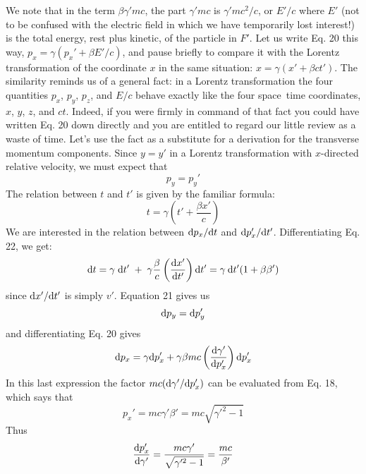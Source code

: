 We note that in the term $\beta\gamma'mc$, the part $\gamma'mc$ is $\gamma'mc^2/c$, or $E'/c$
where $E'$ (not to be confused with the electric field in which we have
temporarily lost interest!) is the total energy, rest plus kinetic, of the
particle in $F'$. Let us write Eq. 20 this way, $p_x = \gamma(p_x' + \beta E'/c)$, and
pause briefly to compare it with the Lorentz transformation of the
coordinate $x$ in the same situation: $x = \gamma(x' + \beta ct')$. The similarity
reminds us of a general fact: in a Lorentz transformation the four
quantities $p_x$, $p_y$, $p_z$, and $E/c$ behave exactly like the four space~time
coordinates, $x$, $y$, $z$, and $ct$. Indeed, if you were firmly in command
of that fact you could have written Eq. 20 down directly and you are
entitled to regard our little review as a waste of time. Let's use the
fact as a substitute for a derivation for the transverse momentum
components. Since $y = y'$ in a Lorentz transformation with
$x$-directed relative velocity, we must expect that
\begin{equation}
  p_y = p_y'
\end{equation}
The relation between $t$ and $t'$ is given by the familiar formula:
\begin{equation}
  t = \gamma\left(t'+\frac{\beta x'}{c}\right)
\end{equation}
We are interested in the relation between $\textup{d} p_x/\textup{d} t$ and $\textup{d} p_x'/\textup{d} t'$.
Differentiating Eq. 22, we get:
\begin{equation}
  \textup{d} t = \gamma\; \textup{d} t'\;+\;\gamma\frac{\beta}{c}\left(\frac{\textup{d} x'}{\textup{d} t'}\right)\textup{d} t'
        = \gamma \:\textup{d} t'(1+\beta\beta')
\end{equation}
since $\textup{d} x'/\textup{d} t'$ is simply $v'$. Equation 21 gives us
\begin{equation}
  \textup{d} p_y = \textup{d} p_y'
\end{equation}
and differentiating Eq. 20 gives
\begin{equation}
  \textup{d} p_x = \gamma \textup{d} p_x' + \gamma\beta mc\left(\frac{\textup{d}\gamma'}{\textup{d} p_x'}\right)\textup{d} p_x'
\end{equation}
In this last expression the factor $mc(\textup{d}\gamma'/\textup{d} p_x')$ can be evaluated from
Eq. 18, which says that
\begin{equation}
  p_x' = mc\gamma'\beta' = mc\sqrt{\gamma'^2-1}
\end{equation}
Thus
\begin{equation}
  \frac{\textup{d} p_x'}{\textup{d}\gamma'} = \frac{mc\gamma'}{\sqrt{\gamma'^2-1}} = \frac{mc}{\beta'}
\end{equation}
